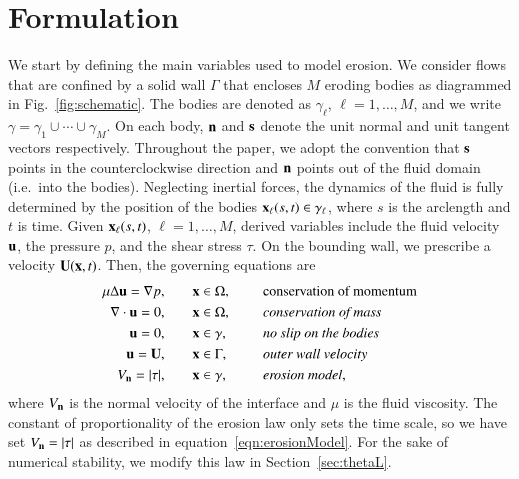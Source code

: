 \documentclass[preprint, 10pt]{elsarticle}
\begin{document}
\section{Formulation}
\label{s:formulation}
We start by defining the main variables used to model erosion.  We consider flows that are confined by a solid wall $\Gamma$ that encloses $M$ eroding bodies as diagrammed in Fig.~\ref{fig:schematic}.  The bodies are denoted as $\gamma_\ell$, $\ell=1,\ldots,M$, and we write $\gamma = \gamma_1 \cup \cdots \cup \gamma_M$.  On each body, $\nn$ and $\ss$ denote the unit normal and unit tangent vectors respectively.  Throughout the paper, we adopt the convention that $\ss$ points in the counterclockwise direction and $\nn$ points out of the fluid domain (i.e.~into the bodies). Neglecting inertial forces, the dynamics of the fluid is fully determined by the position of the bodies $\xx_\ell(s,t) \in \gamma_\ell$, where $s$ is the arclength and $t$ is time.  Given $\xx_\ell(s,t)$, $\ell=1,\ldots,M$, derived variables include the fluid velocity $\uu$, the pressure $p$, and the shear stress $\tau$.   On the bounding wall, we prescribe a velocity $\UU(\xx,t)$.  Then, the governing equations are
\begin{equation}
\label{eqn:erosionModel}
\begin{split}
  \mu \Delta \uu = \grad p, &\hspace{20pt} \xx \in \Omega, \gap &&\mbox{conservation
of momentum}\\
\grad \cdot \uu = 0, &\hspace{20pt} \xx \in \Omega, \gap &&\mbox{\em conservation of mass} \\
\uu = 0, &\hspace{20pt} \xx \in \gamma, \gap &&\mbox{\em no slip on the
bodies} \\
\uu = \UU, &\hspace{20pt} \xx \in \Gamma, \gap &&\mbox{\em outer wall
velocity} \\
\Vn = \abs{\tau}, &\hspace{20pt} \xx \in \gamma,
&&\mbox{\em erosion model},
\end{split}
\end{equation}
where $\Vn$ is the normal velocity of the interface and $\mu$ is the fluid viscosity.  The constant of proportionality of the erosion law only sets the time scale, so we have set $\Vn = |\tau|$ as described in equation~\eqref{eqn:erosionModel}.  For the sake of numerical stability, we modify this law in Section~\ref{sec:thetaL}. 
\end{document}
